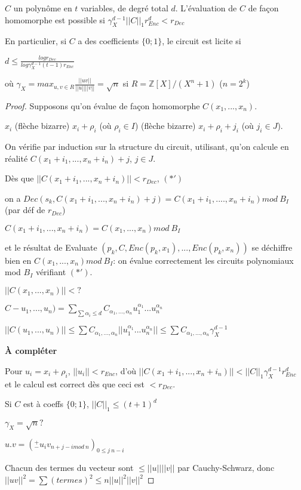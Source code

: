\begin{theorem}
$C$ un polynôme en $t$ variables, de degré total $d$. L'évaluation de $C$ de façon homomorphe est possible si
$\gamma_X^{d-1} ||C||_1 r_{Enc}^d < r_{Dec}$

En particulier, si $C$ a des coefficients $\{ 0 ; 1\}$, le circuit est licite si

$d \leq \frac{log r_{Dec}}{log \gamma_X^{d-1} (t-1) r_{Enc}}$

où $\gamma_X = max_{u, v \in R} \frac{||u v||}{||u|| ||v||}=\sqrt{n}$ si $R= \mathbb{Z}[X]/(X^n +1)$ ($n=2^k$)
\end{theorem}

\begin{proof}
Supposons qu'on évalue de façon homomorphe $C(x_1,...,x_n)$.

$x_i$ (flèche bizarre) $ x_i + \rho_i$ (où $\rho_i \in I$) (flèche bizarre) $x_i + \rho_i + j_i$ (où $j_i \in J$).

On vérifie par induction sur la structure du circuit, utilisant, qu'on calcule en réalité  $C(x_1+i_1,...,x_n+i_n)+j$, $j \in J$.

Dès que $||C(x_1+i_1,...,x_n+i_n)|| < r_{Dec}$, $(*')$

on a $Dec(s_k,C(x_1+i_1,...,x_n+i_n)+j)=C(x_1+i_1,....,x_n+i_n) mod \ B_I$ (par déf de $r_{Dec}$)

$C(x_1+i_1,...,x_n+i_n)=C(x_1,...,x_n) mod \ B_I$

et le résultat de Evaluate $(p_k, C, Enc(p_k,x_1),...,Enc(p_k,x_n))$ se déchiffre bien en $C(x_1,...,x_n) mod \ B_I$: on évalue correctement les circuits polynomiaux mod $B_I$ vérifiant $(*')$.

$||C(x_1,...,x_n)||< ?$

$C-u_1,...,u_n)= \sum_{\sum \alpha_i \leq d} C_{\alpha_1,...,\alpha_n} u_1^{\alpha_1}... u_n^{\alpha_n}$

$||C(u_1,...,u_n)|| \leq \sum C_{\alpha_1,...,\alpha_n} || u_1^{\alpha_1}... u_n^{\alpha_n}|| \leq \sum C_{\alpha_1,...,\alpha_n}  \gamma_X^{d-1}$

\textbf{À compléter}

Pour $u_i = x_i + \rho_i$, $||u_i||< r_{Enc}$, d'où $||C(x_1+i_1,...,x_n+i_n) ||< ||C||_1 \gamma_X^{d-1} r_{Enc}^d$ et le calcul est correct dès que ceci est $< r_{Dec}$.

Si $C$ est à coeffs $\{0;1 \}$, $||C||_1 \leq (t+1)^d$

$\gamma_X = \sqrt{n} ?$

$u.v = (^+_- u_i v_{n+j-i mod \ n})_{0 \leq j \ n-i}$

Chacun des termes du vecteur sont $\leq ||u|| ||v||$ par Cauchy-Schwarz, donc $||u v||^2= \sum(termes)^2 \leq n||u||^2 ||v||^2$
\end{proof}

